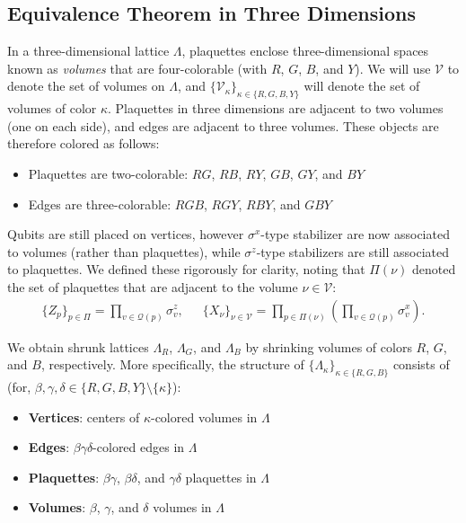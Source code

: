\documentclass[12pt]{article}
\theoremstyle{definition}
\begin{document}
\subsection{Equivalence Theorem in Three Dimensions}
In a three-dimensional lattice $\Lambda$, plaquettes enclose three-dimensional spaces known as \emph{volumes} that are four-colorable (with $R$, $G$, $B$, and $Y$). We will use $\mathcal{V}$ to denote the set of volumes on $\Lambda$, and $\{\mathcal{V}_\kappa\}_{\kappa\in\{R,G,B,Y\}}$ will denote the set of volumes of color $\kappa$. Plaquettes in three dimensions are adjacent to two volumes (one on each side), and edges are adjacent to three volumes. These objects are therefore colored as follows:
    \begin{itemize}
        \item Plaquettes are two-colorable: $RG$, $RB$, $RY$, $GB$, $GY$, and $BY$
        \item Edges are three-colorable: $RGB$, $RGY$, $RBY$, and $GBY$
    \end{itemize}

Qubits are still placed on vertices, however $\sigma^x$-type stabilizer are now associated to volumes (rather than plaquettes), while $\sigma^z$-type stabilizers are still associated to plaquettes. We defined these rigorously for clarity, noting that $\Pi(\nu)$ denoted the set of plaquettes that are adjacent to the volume $\nu\in\mathcal{V}$:
    \begin{align}
        \{Z_p\}_{p\in\Pi} = \prod_{v\in\mathcal{Q}(p)}\sigma^z_v,\enspace\enspace\enspace\{X_\nu\}_{\nu\in\mathcal{V}} = \prod_{p\in\Pi(\nu)}(\prod_{v\in\mathcal{Q}(p)}\sigma^x_v).
    \end{align}

We obtain shrunk lattices $\Lambda_R$, $\Lambda_G$, and $\Lambda_B$ by shrinking volumes of colors $R$, $G$, and $B$, respectively. More specifically, the structure of $\{\Lambda_{\kappa}\}_{\kappa\in\{R,G,B\}}$ consists of (for, $\beta,\gamma,\delta\in\{R,G,B,Y\}\setminus\{\kappa\}$):
    \begin{itemize}
        \item \textbf{Vertices}: centers of $\kappa$-colored volumes in $\Lambda$
        \item \textbf{Edges}: $\beta\gamma\delta$-colored edges in $\Lambda$
        \item \textbf{Plaquettes}: $\beta\gamma$, $\beta\delta$, and $\gamma\delta$ plaquettes in $\Lambda$
        \item \textbf{Volumes}: $\beta$, $\gamma$, and $\delta$ volumes in $\Lambda$
    \end{itemize}
\end{document}
